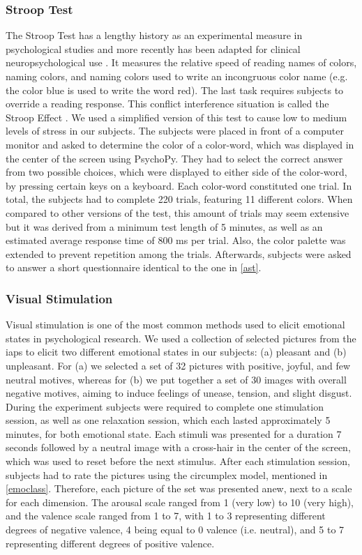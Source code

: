 \subsubsection{Stroop Test}
The Stroop Test has a lengthy history as an experimental measure in psychological studies and more recently has been adapted for clinical neuropsychological use \cite{mitrushina2005handbook}. It measures the relative speed of reading names of colors, naming colors, and naming colors used to write an incongruous color name (e.g. the color blue is used to write the word red). The last task requires subjects to override a reading response. This conflict interference situation is called the Stroop Effect \cite{mitrushina2005handbook}. 
We used a simplified version of this test to cause low to medium levels of stress in our subjects. The subjects were placed in front of a computer monitor and asked to determine the color of a color-word, which was displayed in the center of the screen using PsychoPy. They had to select the correct answer from two possible choices, which were displayed to either side of the color-word, by pressing certain keys on a keyboard. Each color-word constituted one trial. In total, the subjects had to complete 220 trials, featuring 11 different colors. When compared to other versions of the test, this amount of trials may seem extensive but it was derived from a minimum test length of 5 minutes, as well as an estimated average response time of 800 ms per trial. Also, the color palette was extended to prevent repetition among the trials.
Afterwards, subjects were asked to answer a short questionnaire identical to the one in \ref{ast}.
\subsubsection{Visual Stimulation}\label{visstim}
Visual stimulation is one of the most common methods used to elicit emotional states in psychological research. We used a collection of selected pictures from the \gls{iaps} to elicit two different emotional states in our subjects: (a) pleasant and (b) unpleasant. For (a) we selected a set of 32 pictures with positive, joyful, and few neutral motives, whereas for (b) we put together a set of 30 images with overall negative motives, aiming to induce feelings of unease, tension, and slight disgust. During the experiment subjects were required to complete one stimulation session, as well as one relaxation session, which each lasted approximately 5 minutes, for both emotional state. Each stimuli was presented for a duration 7 seconds followed by a neutral image with a cross-hair in the center of the screen, which was used to reset before the next stimulus.
After each stimulation session, subjects had to rate the pictures using the circumplex model, mentioned in \ref{emoclass}. Therefore, each picture of the set was presented anew, next to a scale for each dimension. The arousal scale ranged from 1 (very low) to 10 (very high), and the valence scale ranged from 1 to 7, with 1 to 3 representing different degrees of negative valence, 4 being equal to 0 valence (i.e. neutral), and 5 to 7 representing different degrees of positive valence. 
